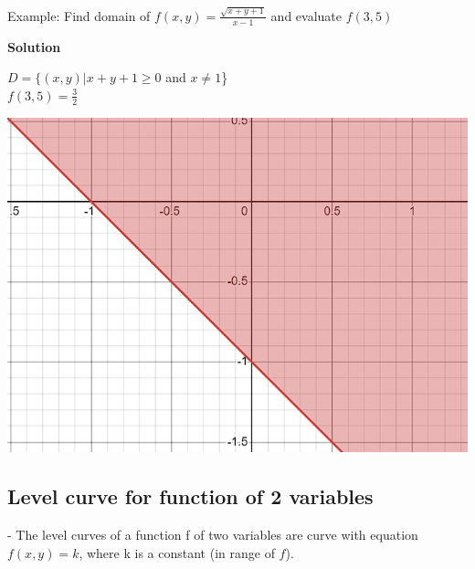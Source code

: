 \documentclass[12pt]{article}
\begin{document}
Example: Find domain of $f(x,y)= \frac{\sqrt{x+y+1}}{x-1}$ and evaluate $f(3,5)$ \\ 
\begin{center}
\textbf{Solution}    
\end{center}

$D = \{(x,y)|x+y+1 \geq 0 $ and $  x \neq 1$\} \\  
$f(3,5) = \frac{3}{2}$ \\
\begin{center}
    \includegraphics[scale=0.5]{domain.png}
\end{center}


\subsection{Level curve for function of 2 variables}
- The level curves of a function f of two variables are curve with equation $f(x,y)=k$, where k is a constant (in range of $f$). 
\end{document}
